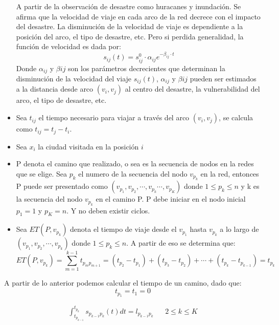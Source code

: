 \documentclass[letter, 10pt]{article}
\begin{document}
\begin{itemize}
    A partir de la observación de desastre como huracanes y inundación. Se afirma que la velocidad de viaje en cada arco de la red decrece con el impacto del desastre. \cite{tufekci1995integrated} La disminución de la velocidad de viaje es dependiente a la posición del arco, el tipo de desastre, etc. Pero si perdida generalidad, la función de velocidad es dada por:
\begin{equation}
	  s_{ij}(t) = s_{ij}^0 \cdot \alpha_{ij} e^{-\beta_{ij}\cdot t}
\end{equation}
Donde \(\alpha_{ij}\) y \(\beta{ij}\) son los parámetros decrecientes que determinan la disminución de la velocidad del viaje \(s_{ij}(t)\), \(\alpha_{ij}\) y \(\beta{ij}\) pueden ser estimados a la distancia desde arco $(v_i,v_j)$ al centro del desastre, la vulnerabilidad del arco, el tipo de desastre, etc.
	\item Sea \(t_{ij}\) el tiempo necesario para viajar a través del arco $(v_i,v_j)$, se calcula como $t_{ij}=t_j-t_i$.
	\item Sea $x_i$ la ciudad visitada en la posición $i$
	\item P denota el camino que realizado, o sea es la secuencia de nodos en la redes que se elige. Sea $p_k$ el numero de la secuencia del nodo $v_{p_k}$	en la red, entonces P puede ser presentado como $(v_{p_1},v_{p_2},\cdots,v_{p_k}\cdots,v_{p_K})$ donde $1\leq p_k \leq n$ y k es la secuencia del nodo   $v_{p_k}$ en el camino P.  P debe iniciar en el nodo inicial $p_1=1$ y $p_K=n$. Y no deben existir ciclos.
	\item Sea $ET(P,v_{p_k})$ denota el tiempo de viaje desde el $v_{p_1}$ hasta $v_{p_k}$ a lo largo de $(v_{p_1},v_{p_2},\cdots,v_{p_k})$ donde $1\leq p_k \leq n$. A partir de eso se determina que:
	\begin{equation}
		ET(P,v_{p_k})= \sum_{m=1}^{k-1} t_{p_mp_{m+1}} = (t_{p_2} - t_{p_1}) +(t_{p_3} - t_{p_2}) + \cdots + (t_{p_k} - t_{p_{k-1}}) = t_{p_k}
	\end{equation}
	

\end{itemize}
 A partir de lo anterior podemos calcular el tiempo de un camino, dado que:
\begin{equation}\label{borde}
	  t_{p_1} = t_1 = 0
\end{equation} 
 
\begin{eqnarray}\label{int}
\int_{t_{p_{k-1}}}^{t_{p_k}} s_{p_{k-1}p_k}(t)dt = l_{p_{k-1}p_k} & & \text{\(2 \leq k \leq  K\)}\\
 \end{eqnarray}
 
\end{document}
